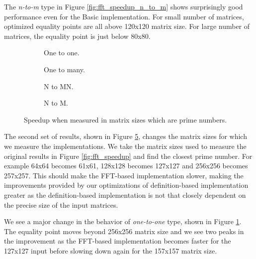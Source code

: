 The \textit{n-to-m} type in Figure \ref{fig:fft_speedup_n_to_m} shows surprisingly good performance even for the Basic implementation. For small number of matrices, optimized equality points are all above 120x120 matrix size. For large number of matrices, the equality point is just below 80x80.

\begin{figure}[ht]
	\centering	
	\begin{subfigure}{0.35\textwidth}
		\centering
		\def\svgwidth{\textwidth}
		
		\caption{One to one.}
		\label{fig:fft_speedup_antifft_one_to_one}
	\end{subfigure}
	\begin{subfigure}{0.35\textwidth}
		\centering
		\def\svgwidth{\textwidth}
		
		\caption{One to many.}
		\label{fig:fft_speedup_antifft_one_to_many}
	\end{subfigure}
	\begin{subfigure}{0.35\textwidth}
		\centering
		\def\svgwidth{\textwidth}
		
		\caption{N to MN.}
		\label{fig:fft_speedup_antifft_n_to_mn}
	\end{subfigure}
	\begin{subfigure}{0.35\textwidth}
		\centering
		\def\svgwidth{\textwidth}
		
		\caption{N to M.}
		\label{fig:fft_speedup_antifft_n_to_m}
	\end{subfigure}
	\caption{Speedup when measured in matrix sizes which are prime numbers.}
	\label{fig:fft_speedup_antifft}
\end{figure}

The second set of results, shown in Figure \ref{fig:fft_speedup_antifft}, changes the matrix sizes for which we measure the implementations. We take the matrix sizes used to measure the original results in Figure \ref{fig:fft_speedup} and find the closest prime number. For example 64x64 becomes 61x61, 128x128 becomes 127x127 and 256x256 becomes 257x257. This should make the FFT-based implementation slower, making the improvements provided by our optimizations of definition-based implementation greater as the definition-based implementation is not that closely dependent on the precise size of the input matrices.

We see a major change in the behavior of \textit{one-to-one} type, shown in Figure \ref{fig:fft_speedup_antifft_one_to_one}. The equality point moves beyond 256x256 matrix size and we see two peaks in the improvement as the FFT-based implementation becomes faster for the 127x127 input before slowing down again for the 157x157 matrix size. 

